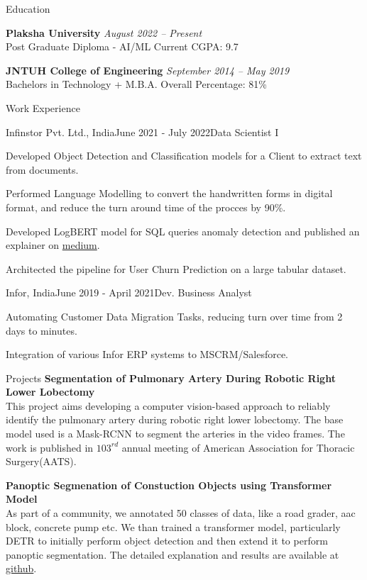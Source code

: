 \documentclass{resume}
\begin{document}
\begin{rSection}{Education}


{\bf Plaksha University} \hfill {\em August 2022 -- Present} 
\\ Post Graduate Diploma - AI/ML\hfill { Current CGPA: 9.7 }

{\bf JNTUH College of Engineering} \hfill {\em September 2014 -- May 2019} 
\\ Bachelors in Technology + M.B.A.\hfill { Overall Percentage: 81\% }

\end{rSection}

\begin{rSection}{Work Experience}
	\begin{rSubsection}{Infinstor Pvt. Ltd., India}{June 2021 - July 2022}{Data Scientist I}{}
	 \item Developed Object Detection and Classification models for a Client to extract text from documents.
	 \item Performed Language Modelling to convert the handwritten forms in digital format, and reduce the turn around time of the procces by 90\%.
	 \item Developed LogBERT model for SQL queries anomaly detection and published an explainer on \href{https://medium.com/infinstor/logbert-log-file-anomaly-detection-using-bert-an-explainer-db20bfd2f91f}{medium}.
	 \item Architected the pipeline for User Churn Prediction on a large tabular dataset.
	\end{rSubsection}
	\begin{rSubsection}{Infor, India}{June 2019 - April 2021}{Dev. Business Analyst}{}
	 \item Automating Customer Data Migration Tasks, reducing turn over time from 2 days to minutes.
	 \item Integration of various Infor ERP systems to MSCRM/Salesforce.
	\end{rSubsection}
	
\end{rSection}

\begin{rSection}{Projects}
{\bf Segmentation of Pulmonary Artery During Robotic Right Lower Lobectomy}
\\This project aims developing a computer vision-based approach to reliably identify the pulmonary artery during robotic right lower lobectomy. The base model used is a Mask-RCNN to segment the arteries in the video frames. The work is published in $103^{rd}$ annual meeting of American Association for Thoracic Surgery(AATS).

{\bf Panoptic Segmenation of Constuction Objects using Transformer Model}
\\As part of a community, we annotated 50 classes of data, like a road grader, aac block, concrete pump etc. We than trained a transformer model, particularly DETR to initially perform object detection and then extend it to perform panoptic segmentation. The detailed explanation and results are available at \href{https://github.com/abdksyed/DETR}{github}.


\end{rSection}
\end{document}
